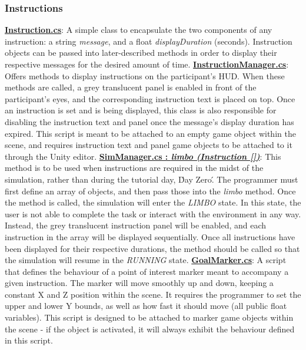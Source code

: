 \documentclass{article}
\begin{document}
\subsubsection*{Instructions} %
\href{https://bit.ly/2JFHEED}{\textbf{Instruction.cs}}: A simple class to encapsulate the two components of any instruction: a string \textit{message}, and a float \textit{displayDuration} (seconds). Instruction objects can be passed into later-described methods in order to display their respective messages for the desired amount of time. \newline \newline
\href{https://bit.ly/2TzLE9i}{\textbf{InstructionManager.cs}}: Offers methods to display instructions on the participant's HUD. When these methods are called, a grey translucent panel is enabled in front of the participant's eyes, and the corresponding instruction text is placed on top. Once an instruction is set and is being displayed, this class is also responsible for disabling the instruction text and panel once the message's display duration has expired. This script is meant to be attached to an empty game object within the scene, and requires instruction text and panel game objects to be attached to it through the Unity editor. \newline \newline
\href{https://bit.ly/2UhmSzq}{\textbf{SimManager.cs : \textit{limbo (Instruction [])}}}: This method is to be used when instructions are required in the midst of the simulation, rather than during the tutorial day, \'Day Zero\'. The programmer must first define an array of  objects, and then pass those into the \textit{limbo} method. Once the method is called, the simulation will enter the \textit{LIMBO} state. In this state, the user is not able to complete the task or interact with the environment in any way. Instead, the grey translucent instruction panel will be enabled, and each instruction in the array will be displayed sequentially. Once all instructions have been displayed for their respective durations, the  method should be called so that the simulation will resume in the \textit{RUNNING} state. \newline \newline
\href{https://bit.ly/2Yooc2m}{\textbf{GoalMarker.cs}}: A script that defines the behaviour of a point of interest marker meant to accompany a given instruction. The marker will move smoothly up and down, keeping a constant X and Z position within the scene. It requires the programmer to set the upper and lower Y bounds, as well as how fast it should move (all public float variables). This script is designed to be attached to marker game objects within the scene - if the object is activated, it will always exhibit the behaviour defined in this script. \newline \newline
\end{document}
